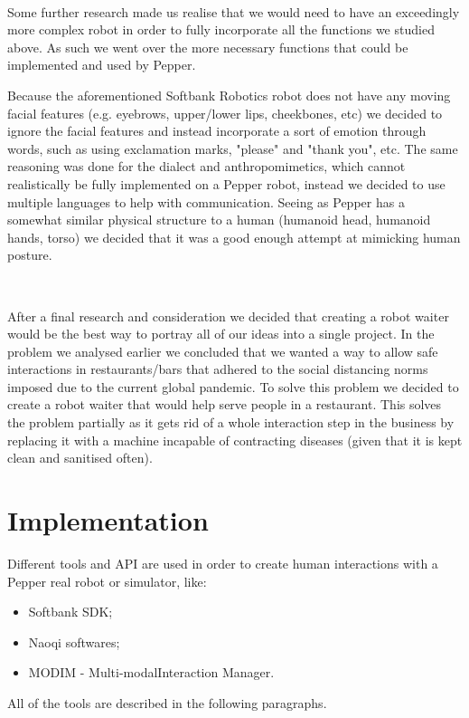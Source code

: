 \documentclass[12pt, letterpaper, twoside]{article}
\begin{document}
\

Some further research made us realise that we would need to have an exceedingly more complex robot in order to fully incorporate all the functions we studied above. As such we went over the more necessary functions that could be implemented and used by Pepper.

Because the aforementioned Softbank Robotics robot does not have any moving facial features (e.g. eyebrows, upper/lower lips, cheekbones, etc) we decided to ignore the facial features and instead incorporate a sort of emotion through words, such as using exclamation marks, "please" and "thank you", etc. The same reasoning was done for the dialect and anthropomimetics, which cannot realistically be fully implemented on a Pepper robot, instead we decided to use multiple languages to help with communication. Seeing as Pepper has a somewhat similar physical structure to a human (humanoid head, humanoid hands, torso) we decided that it was a good enough attempt at mimicking human posture.

\

After a final research and consideration we decided that creating a robot waiter would be the best way to portray all of our ideas into a single project.
In the problem we analysed earlier we concluded that we wanted a way to allow safe interactions in restaurants/bars that adhered to the social distancing norms imposed due to the current global pandemic. To solve this problem we decided to create a robot waiter that would help serve people in a restaurant. This solves the problem partially as it gets rid of a whole interaction step in the business by replacing it with a machine incapable of contracting diseases (given that it is kept clean and sanitised often). 

\newpage
\section{Implementation}
Different tools and API are used in order to create human interactions with a Pepper real robot or simulator, like:

\begin{itemize}
	\item Softbank SDK;
	\item Naoqi softwares;
	\item MODIM - Multi-modalInteraction Manager.
\end{itemize}

All of the tools are described in the following paragraphs.\\
\end{document}
